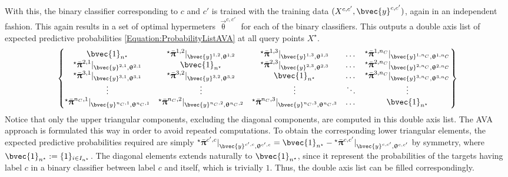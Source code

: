				With this, the binary classifier corresponding to $c$ and $c'$ is trained with the training data $(X^{c, c'}, \bvec{y}^{c, c'})$, again in an independent fashion. This again results in a set of optimal hypermeters $\vec{\uptheta}^{c, c'}$ for each of the binary classifiers. This outputs a double axis list of expected predictive probabilities \eqref{Equation:ProbabilityListAVA} at all query points $X^{\star}$. \begin{equation}
					\begin{Bmatrix*}
						\bvec{1}_{n^{\star}} & {^{\star}}\bar{\vec{\uppi}}^{1, 2} |_{\bvec{y}^{1, 2}, \vec{\uptheta}^{1, 2}} & {^{\star}}\bar{\vec{\uppi}}^{1, 3} |_{\bvec{y}^{1, 3}, \vec{\uptheta}^{1, 3}} & \dots & {^{\star}}\bar{\vec{\uppi}}^{1, n_{C}} |_{\bvec{y}^{1, n_{C}}, \vec{\uptheta}^{1, n_{C}}} \\
						{^{\star}}\bar{\vec{\uppi}}^{2, 1} |_{\bvec{y}^{2, 1}, \vec{\uptheta}^{2, 1}} & \bvec{1}_{n^{\star}} & {^{\star}}\bar{\vec{\uppi}}^{2, 3} |_{\bvec{y}^{2, 3}, \vec{\uptheta}^{2, 3}} & \dots & {^{\star}}\bar{\vec{\uppi}}^{2, n_{C}} |_{\bvec{y}^{2, n_{C}}, \vec{\uptheta}^{2, n_{C}}} \\
						{^{\star}}\bar{\vec{\uppi}}^{3, 1} |_{\bvec{y}^{3, 1}, \vec{\uptheta}^{3, 1}} & {^{\star}}\bar{\vec{\uppi}}^{3, 2} |_{\bvec{y}^{3, 2}, \vec{\uptheta}^{3, 2}} & \bvec{1}_{n^{\star}} & \dots & {^{\star}}\bar{\vec{\uppi}}^{3, n_{C}} |_{\bvec{y}^{3, n_{C}}, \vec{\uptheta}^{3, n_{C}}} \\
						\vdots & \vdots & \vdots & \ddots & \vdots \\
						{^{\star}}\bar{\vec{\uppi}}^{n_{C}, 1} |_{\bvec{y}^{n_{C}, 1}, \vec{\uptheta}^{n_{C}, 1}} & {^{\star}}\bar{\vec{\uppi}}^{n_{C}, 2} |_{\bvec{y}^{n_{C}, 2}, \vec{\uptheta}^{n_{C}, 2}} & {^{\star}}\bar{\vec{\uppi}}^{n_{C}, 3} |_{\bvec{y}^{n_{C}, 3}, \vec{\uptheta}^{n_{C}, 3}} & \dots & \bvec{1}_{n^{\star}}
					\end{Bmatrix*} 
				\label{Equation:ProbabilityListAVA}
				\end{equation} Notice that only the upper triangular components, excluding the diagonal components, are computed in this double axis list. The AVA approach is formulated this way in order to avoid repeated computations. To obtain the corresponding lower triangular elements, the expected predictive probabilities required are simply ${^{\star}}\bar{\vec{\uppi}}^{c', c} |_{\bvec{y}^{c', c}, \vec{\uptheta}^{c', c}} = \bvec{1}_{n^{\star}} - {^{\star}}\bar{\vec{\uppi}}^{c, c'} |_{\bvec{y}^{c, c'}, \vec{\uptheta}^{c, c'}}$ by symmetry, where $\bvec{1}_{n^{\star}} := \{1\}_{i \in I_{n^{\star}}}$. The diagonal elements extends naturally to $\bvec{1}_{n^{\star}}$, since it represent the probabilities of the targets having label $c$ in a binary classifier between label $c$ and itself, which is trivially $1$. Thus, the double axis list can be filled correspondingly.


